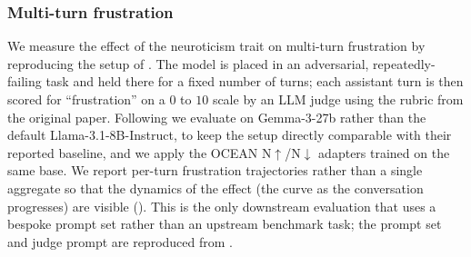 \subsubsection{Multi-turn frustration}\label{sec:appendix-e-frustration}

We measure the effect of the neuroticism trait on multi-turn frustration by reproducing the setup of \citet{soligo2026gemma}. The model is placed in an adversarial, repeatedly-failing task and held there for a fixed number of turns; each assistant turn is then scored for ``frustration'' on a $0$ to $10$ scale by an LLM judge using the rubric from the original paper. Following \citet{soligo2026gemma} we evaluate on Gemma-3-27b rather than the default Llama-3.1-8B-Instruct, to keep the setup directly comparable with their reported baseline, and we apply the OCEAN N$\uparrow$/N$\downarrow$ adapters trained on the same base. We report per-turn frustration trajectories rather than a single aggregate so that the dynamics of the effect (the curve as the conversation progresses) are visible (). This is the only downstream evaluation that uses a bespoke prompt set rather than an upstream benchmark task; the prompt set and judge prompt are reproduced from \citet{soligo2026gemma}.
\FloatBarrier